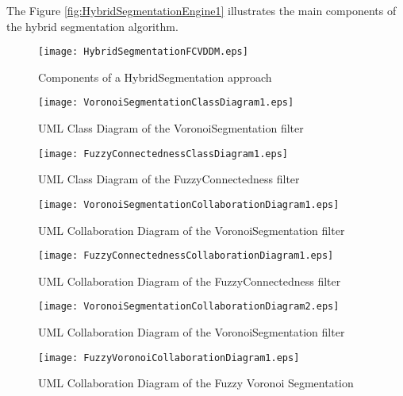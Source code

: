 The Figure \ref{fig:HybridSegmentationEngine1} illustrates the main
components of the hybrid segmentation algorithm.

\begin{figure}
\center
\texttt{[image: HybridSegmentationFCVDDM.eps]}
\caption{Components of a HybridSegmentation approach}
\label{fig:HybridSegmentationFCVDDM}
\end{figure}


\begin{figure}
\center
\texttt{[image: VoronoiSegmentationClassDiagram1.eps]}
\caption{UML Class Diagram of the VoronoiSegmentation filter}
\label{fig:VoronoiSegmentationClassDiagram1}
\end{figure}


\begin{figure}
\center
\texttt{[image: FuzzyConnectednessClassDiagram1.eps]}
\caption{UML Class Diagram of the FuzzyConnectedness filter}
\label{fig:FuzzyConnectednessClassDiagram1}
\end{figure}


\begin{figure}
\center
\texttt{[image: VoronoiSegmentationCollaborationDiagram1.eps]}
\caption{UML Collaboration Diagram of the VoronoiSegmentation filter}
\label{fig:VoronoiSegmentationCollaborationDiagram1}
\end{figure}



\begin{figure}
\center
\texttt{[image: FuzzyConnectednessCollaborationDiagram1.eps]}
\caption{UML Collaboration Diagram of the FuzzyConnectedness filter}
\label{fig:FuzzyConnectednessCollaborationDiagram1}
\end{figure}



\begin{figure}
\center
\texttt{[image: VoronoiSegmentationCollaborationDiagram2.eps]}
\caption{UML Collaboration Diagram of the VoronoiSegmentation filter}
\label{fig:VoronoiSegmentationCollaborationDiagram2}
\end{figure}




\begin{figure}
\center
\texttt{[image: FuzzyVoronoiCollaborationDiagram1.eps]}
\caption{UML Collaboration Diagram of the Fuzzy Voronoi Segmentation}
\label{fig:FuzzyVoronoiCollaborationDiagram1}
\end{figure}




